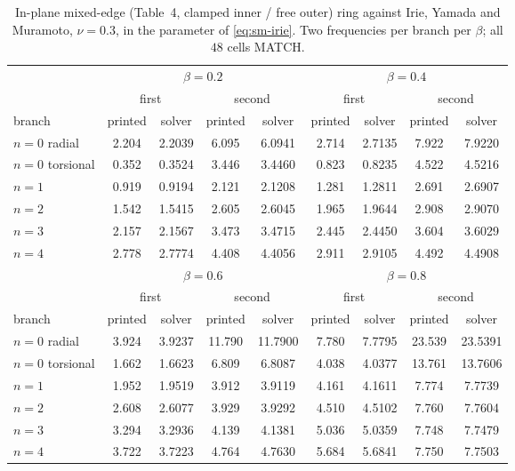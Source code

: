 \documentclass[11pt]{article}
\begin{document}
\begin{center}\footnotesize
\begin{longtable}{lcccccccc}
\caption{In-plane mixed-edge (Table~4, clamped inner / free outer) ring against Irie, Yamada and Muramoto, $\nu=0.3$, in the parameter of \eqref{eq:sm-irie}. Two frequencies per branch per $\beta$; all $48$ cells MATCH.}
\label{tab:sm-irie-t4}\\
\toprule
& \multicolumn{4}{c}{$\beta=0.2$} & \multicolumn{4}{c}{$\beta=0.4$}\\
\cmidrule(lr){2-5}\cmidrule(lr){6-9}
& \multicolumn{2}{c}{first} & \multicolumn{2}{c}{second} & \multicolumn{2}{c}{first} & \multicolumn{2}{c}{second}\\
branch & printed & solver & printed & solver & printed & solver & printed & solver\\
\midrule
$n=0$ radial & 2.204 & 2.2039 & 6.095 & 6.0941 & 2.714 & 2.7135 & 7.922 & 7.9220 \\
$n=0$ torsional & 0.352 & 0.3524 & 3.446 & 3.4460 & 0.823 & 0.8235 & 4.522 & 4.5216 \\
$n=1$ & 0.919 & 0.9194 & 2.121 & 2.1208 & 1.281 & 1.2811 & 2.691 & 2.6907 \\
$n=2$ & 1.542 & 1.5415 & 2.605 & 2.6045 & 1.965 & 1.9644 & 2.908 & 2.9070 \\
$n=3$ & 2.157 & 2.1567 & 3.473 & 3.4715 & 2.445 & 2.4450 & 3.604 & 3.6029 \\
$n=4$ & 2.778 & 2.7774 & 4.408 & 4.4056 & 2.911 & 2.9105 & 4.492 & 4.4908 \\
\midrule
& \multicolumn{4}{c}{$\beta=0.6$} & \multicolumn{4}{c}{$\beta=0.8$}\\
\cmidrule(lr){2-5}\cmidrule(lr){6-9}
& \multicolumn{2}{c}{first} & \multicolumn{2}{c}{second} & \multicolumn{2}{c}{first} & \multicolumn{2}{c}{second}\\
branch & printed & solver & printed & solver & printed & solver & printed & solver\\
\midrule
$n=0$ radial & 3.924 & 3.9237 & 11.790 & 11.7900 & 7.780 & 7.7795 & 23.539 & 23.5391 \\
$n=0$ torsional & 1.662 & 1.6623 & 6.809 & 6.8087 & 4.038 & 4.0377 & 13.761 & 13.7606 \\
$n=1$ & 1.952 & 1.9519 & 3.912 & 3.9119 & 4.161 & 4.1611 & 7.774 & 7.7739 \\
$n=2$ & 2.608 & 2.6077 & 3.929 & 3.9292 & 4.510 & 4.5102 & 7.760 & 7.7604 \\
$n=3$ & 3.294 & 3.2936 & 4.139 & 4.1381 & 5.036 & 5.0359 & 7.748 & 7.7479 \\
$n=4$ & 3.722 & 3.7223 & 4.764 & 4.7630 & 5.684 & 5.6841 & 7.750 & 7.7503 \\
\bottomrule
\end{longtable}
\end{center}
\end{document}
